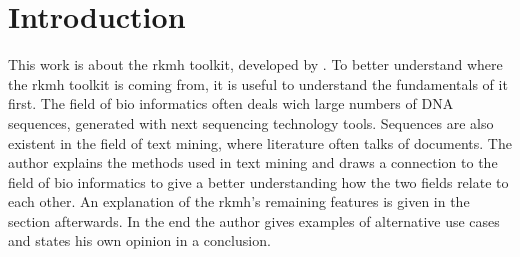\section{Introduction}

This work is about the rkmh toolkit, developed by \citeauthor{rkmh} \cite{rkmh}. To better understand where the rkmh toolkit is coming from, it is useful to understand the fundamentals of it first. The field of bio informatics often deals wich large numbers of DNA sequences, generated with next sequencing technology tools. Sequences are also existent in the field of text mining, where literature often talks of documents. The author explains the methods used in text mining and draws a connection to the field of bio informatics to give a better understanding how the two fields relate to each other. An explanation of the rkmh's remaining features is given in the section afterwards. In the end the author gives examples of alternative use cases and states his own opinion in a conclusion.